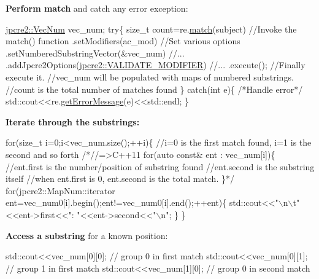 {\bfseries Perform match} and catch any error exception\+:


\begin{DoxyCode}
\hyperlink{namespacejpcre2_ac1cf752c8fbb0be78020be3b80e77ce3}{jpcre2::VecNum} vec\_num;
\textcolor{keywordflow}{try}\{
    \textcolor{keywordtype}{size\_t} count=re.\hyperlink{classjpcre2_1_1Regex_ab93775a93a0a537d09b9e9ab4a5a3894}{match}(subject)                               \textcolor{comment}{//Invoke the match() function}
                   .setModifiers(ac\_mod)                         \textcolor{comment}{//Set various options}
                   .setNumberedSubstringVector(&vec\_num)         \textcolor{comment}{//...}
                   .addJpcre2Options(\hyperlink{namespacejpcre2_a85c143271501e383843f45b9999c2f00a9124b768bcae4d51430aa7f26126f387}{jpcre2::VALIDATE\_MODIFIER})  \textcolor{comment}{//...}
                   .execute();                                   \textcolor{comment}{//Finally execute it.}
    \textcolor{comment}{//vec\_num will be populated with maps of numbered substrings.}
    \textcolor{comment}{//count is the total number of matches found}
\}
\textcolor{keywordflow}{catch}(\textcolor{keywordtype}{int} e)\{
    \textcolor{comment}{/*Handle error*/}
    std::cout<<re.\hyperlink{classjpcre2_1_1Regex_a92b75c438ccff871205b2175a6141fd5}{getErrorMessage}(e)<<std::endl;
\}
\end{DoxyCode}
 {\bfseries Iterate through the substrings\+:}


\begin{DoxyCode}
\textcolor{keywordflow}{for}(\textcolor{keywordtype}{size\_t} i=0;i<vec\_num.size();++i)\{
    \textcolor{comment}{//i=0 is the first match found, i=1 is the second and so forth}
    \textcolor{comment}{/*//=>C++11}
\textcolor{comment}{    for(auto const& ent : vec\_num[i])\{}
\textcolor{comment}{        //ent.first is the number/position of substring found}
\textcolor{comment}{        //ent.second is the substring itself}
\textcolor{comment}{        //when ent.first is 0, ent.second is the total match.}
\textcolor{comment}{    \}*/}
    \textcolor{keywordflow}{for}(jpcre2::MapNum::iterator ent=vec\_num0[i].begin();ent!=vec\_num0[i].end();++ent)\{
        std::cout<<\textcolor{stringliteral}{"\(\backslash\)n\(\backslash\)t"}<<ent->first<<\textcolor{stringliteral}{": "}<<ent->second<<\textcolor{stringliteral}{"\(\backslash\)n"};
    \}
\}
\end{DoxyCode}
 {\bfseries Access a substring} for a known position\+:


\begin{DoxyCode}
std::cout<<vec\_num[0][0]; \textcolor{comment}{// group 0 in first match}
std::cout<<vec\_num[0][1]; \textcolor{comment}{// group 1 in first match}
std::cout<<vec\_num[1][0]; \textcolor{comment}{// group 0 in second match}
\end{DoxyCode}


